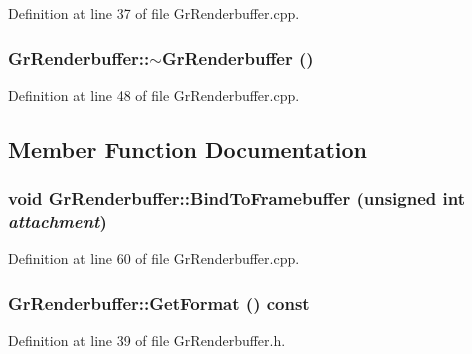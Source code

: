 \begin{CompactItemize}
Definition at line 37 of file GrRenderbuffer.cpp.\hypertarget{class_gr_renderbuffer_e122e8cab34ef92c2e745f19b9174cce}{
\subsubsection[{$\sim$GrRenderbuffer}]{\setlength{\rightskip}{0pt plus 5cm}GrRenderbuffer::$\sim$GrRenderbuffer ()}}
\label{class_gr_renderbuffer_e122e8cab34ef92c2e745f19b9174cce}




Definition at line 48 of file GrRenderbuffer.cpp.

\subsection{Member Function Documentation}
\hypertarget{class_gr_renderbuffer_a81a6b698cc1f560c2b5e98a101611c0}{
\subsubsection[{BindToFramebuffer}]{\setlength{\rightskip}{0pt plus 5cm}void GrRenderbuffer::BindToFramebuffer (unsigned int {\em attachment})}}
\label{class_gr_renderbuffer_a81a6b698cc1f560c2b5e98a101611c0}




Definition at line 60 of file GrRenderbuffer.cpp.\hypertarget{class_gr_renderbuffer_156a47cf6943e4b0714166f2eb69288d}{
\subsubsection[{GetFormat}]{ GrRenderbuffer::GetFormat () const}}
\label{class_gr_renderbuffer_156a47cf6943e4b0714166f2eb69288d}




Definition at line 39 of file GrRenderbuffer.h.\hypertarget{class_gr_renderbuffer_8853c79e467fa53b0a9c8b619f82f735}{
}
\end{CompactItemize}
